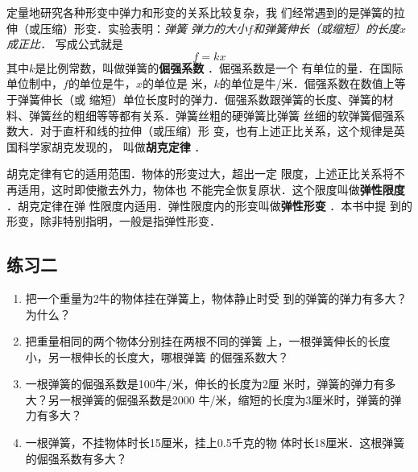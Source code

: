     定量地研究各种形变中弹力和形变的关系比较复杂，我
们经常遇到的是弹簧的拉伸（或压缩）形变．实验表明：\textit{弹簧
弹力的大小$f$和弹簧伸长（或缩短）的长度$x$成正比．} 
写成公式就是
\[f=kx\]
其中$k$是比例常数，叫做弹簧的\textbf{倔强系数} ．倔强系数是一个
有单位的量．在国际单位制中，$f$的单位是牛，$x$的单位是
米，$k$的单位是牛/米．倔强系数在数值上等于弹簧伸长（或
缩短）单位长度时的弹力．倔强系数跟弹簧的长度、弹簧的材
料、弹簧丝的粗细等等都有关系．弹簧丝粗的硬弹簧比弹簧
丝细的软弹簧倔强系数大．对于直杆和线的拉伸（或压缩）形
变，也有上述正比关系，这个规律是英国科学家胡克发现的，
叫做\textbf{胡克定律} ．

    胡克定律有它的适用范围．物体的形变过大，超出一定
限度，上述正比关系将不再适用，这时即使撤去外力，物体也
不能完全恢复原状．这个限度叫做\textbf{弹性限度} ．胡克定律在弹
性限度内适用．弹性限度内的形变叫做\textbf{弹性形变} ．本书中提
到的形变，除非特别指明，一般是指弹性形变．

\subsection*{练习二} 
\begin{enumerate} 
\item 把一个重量为2牛的物体挂在弹簧上，物体静止时受
到的弹簧的弹力有多大？为什么？
\item 把重量相同的两个物体分别挂在两根不同的弹簧
上，一根弹簧伸长的长度小，另一根伸长的长度大，哪根弹簧
的倔强系数大？
\item 一根弹簧的倔强系数是100牛/米，伸长的长度为2厘
米时，弹簧的弹力有多大？另一根弹簧的倔强系数是2000
牛/米，缩短的长度为3厘米时，弹簧的弹力有多大？
\item 一根弹簧，不挂物体时长15厘米，挂上0.5千克的物
体时长18厘米．这根弹簧的倔强系数有多大？
\end{enumerate} 

